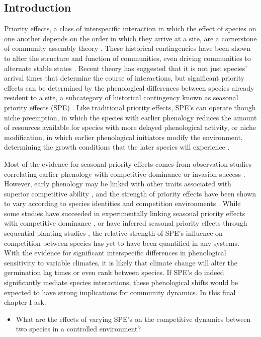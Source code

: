 \documentclass[12pt]{article}\usepackage[]{graphicx}\usepackage[]{color}
\begin{document}
\subsection*{Introduction}
\indent\indent Priority effects, a class of interspecific interaction in which the effect of species on one another depends on the order in which they arrive at a site, are a cornerstone of community assembly theory \citep{Fukami2015}. These historical contingencies have been shown to alter the structure and function of communities, even driving communities to alternate stable states \citep{Fukami2011}. Recent theory has suggested that it is not just species' arrival times that determine the course of interactions, but significant priority effects can be determined by the phenological differences between species already resident to a site, a subcategory of historical contingency known as seasonal priority effects (SPE) \citep{Wainwright2012}. Like traditional priority effects, SPE's can operate though niche preemption, in which the species with earlier phenology reduces the amount of resources available for species with more delayed phenological activity, or niche modification, in which earlier phenological initiators modify the environment, determining the growth conditions that the later species will experience \citep{Fukami2015}.
\par Most of the evidence for seasonal priority effects comes from observation studies correlating earlier phenology with competitive dominance or invasion success \citep{Gioria2018}. However, early phenology may be linked with other traits associated with superior competitive ability \citep{Dickson2012}, and the strength of priority effects have been shown to vary according to species identities \citep{Cleland2015} and competition environments \citep{Kardol2013}. While some studies have succeeded in experimentally linking seasonal priority effects with competitive dominance \citep{Wainwright2012}, or have inferred seasonal priority effects through sequential planting studies \citep{Korner2008}, the relative strength of SPE's influence on competition between species has yet to have been quantified in any systems.\\
\indent With the evidence for significant interspecific differences in phenological sensitivity to variable climates, it is likely that climate change will alter the germination lag times or even rank between species. If SPE's do indeed significantly mediate species interactions, these phenological shifts would be expected to have strong implications for community dynamics. In this final chapter I ask:
\begin{itemize}
\item What are the effects of varying SPE's on the competitive dynamics between two species in a controlled environment?
\end{itemize}
\end{document}
